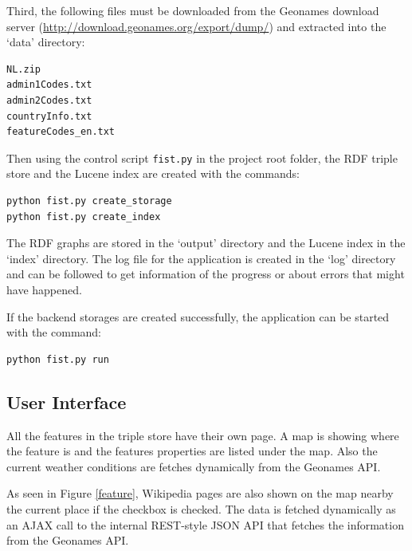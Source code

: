 \documentclass[a4paper,12pt]{article}
\begin{document}
\noindent Third, the following files must be downloaded from the
Geonames download server
(\url{http://download.geonames.org/export/dump/}) and extracted into
the `data' directory:

\begin{verbatim}
NL.zip
admin1Codes.txt
admin2Codes.txt
countryInfo.txt
featureCodes_en.txt
\end{verbatim}

\noindent Then using the control script \texttt{fist.py} in the
project root folder, the RDF triple store and the Lucene index are
created with the commands:

\begin{verbatim}
python fist.py create_storage
python fist.py create_index
\end{verbatim}

\noindent The RDF graphs are stored in the `output' directory and the
Lucene index in the `index' directory. The log file for the
application is created in the `log' directory and can be followed to
get information of the progress or about errors that might have
happened.

If the backend storages are created successfully, the application can
be started with the command:

\begin{verbatim}
python fist.py run
\end{verbatim}

\subsection{User Interface}

All the features in the triple store have their own page. A map is
showing where the feature is and the features properties are listed
under the map. Also the current weather conditions are fetches
dynamically from the Geonames API.

As seen in Figure \ref{feature}, Wikipedia pages are also shown on the
map nearby the current place if the checkbox is checked. The data is
fetched dynamically as an AJAX call to the internal REST-style JSON
API that fetches the information from the Geonames API.
\end{document}
